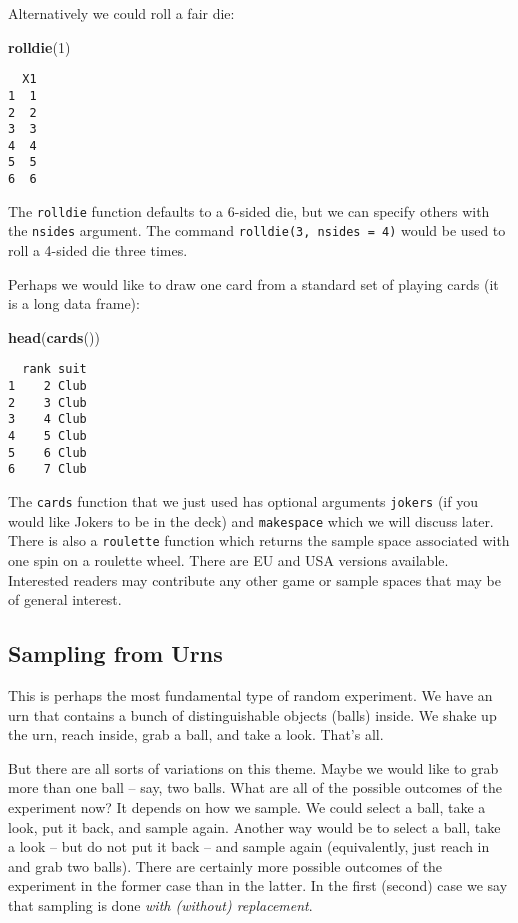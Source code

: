 \documentclass[]{book}
\newenvironment{Shaded}{\begin{snugshade}}{\end{snugshade}}
\newcommand{\KeywordTok}[1]{\textcolor[rgb]{0.13,0.29,0.53}{\textbf{{#1}}}}
\newcommand{\DecValTok}[1]{\textcolor[rgb]{0.00,0.00,0.81}{{#1}}}
\newcommand{\NormalTok}[1]{{#1}}
\numberwithin{equation}{chapter}
\numberwithin{figure}{chapter}
\theoremstyle{plain}
\theoremstyle{definition}
\theoremstyle{remark}
\theoremstyle{definition}
\theoremstyle{definition}
\theoremstyle{remark}
\begin{document}
Alternatively we could roll a fair die:

\begin{Shaded}
\begin{Highlighting}[]
\KeywordTok{rolldie}\NormalTok{(}\DecValTok{1}\NormalTok{) }
\end{Highlighting}
\end{Shaded}

\begin{verbatim}
  X1
1  1
2  2
3  3
4  4
5  5
6  6
\end{verbatim}

The \texttt{rolldie} function defaults to a 6-sided die, but we can
specify others with the \texttt{nsides} argument. The command
\texttt{rolldie(3,\ nsides\ =\ 4)} would be used to roll a 4-sided die
three times.

Perhaps we would like to draw one card from a standard set of playing
cards (it is a long data frame):

\begin{Shaded}
\begin{Highlighting}[]
\KeywordTok{head}\NormalTok{(}\KeywordTok{cards}\NormalTok{()) }
\end{Highlighting}
\end{Shaded}

\begin{verbatim}
  rank suit
1    2 Club
2    3 Club
3    4 Club
4    5 Club
5    6 Club
6    7 Club
\end{verbatim}

The \texttt{cards} function that we just used has optional arguments
\texttt{jokers} (if you would like Jokers to be in the deck) and
\texttt{makespace} which we will discuss later. There is also a
\texttt{roulette} function which returns the sample space associated
with one spin on a roulette wheel. There are EU and USA versions
available. Interested readers may contribute any other game or sample
spaces that may be of general interest.

\subsection{Sampling from Urns}\label{sub-sampling-from-urns}

This is perhaps the most fundamental type of random experiment. We have
an urn that contains a bunch of distinguishable objects (balls) inside.
We shake up the urn, reach inside, grab a ball, and take a look. That's
all.

But there are all sorts of variations on this theme. Maybe we would like
to grab more than one ball -- say, two balls. What are all of the
possible outcomes of the experiment now? It depends on how we sample. We
could select a ball, take a look, put it back, and sample again. Another
way would be to select a ball, take a look -- but do not put it back --
and sample again (equivalently, just reach in and grab two balls). There
are certainly more possible outcomes of the experiment in the former
case than in the latter. In the first (second) case we say that sampling
is done \emph{with (without) replacement}.
\end{document}
